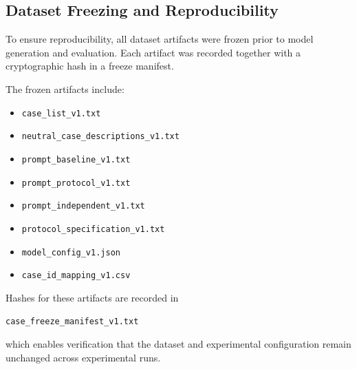 \subsection{Dataset Freezing and Reproducibility}

To ensure reproducibility, all dataset artifacts were frozen prior to model
generation and evaluation. Each artifact was recorded together with a
cryptographic hash in a freeze manifest.

The frozen artifacts include:

\begin{itemize}

\item \texttt{case\_list\_v1.txt}

\item \texttt{neutral\_case\_descriptions\_v1.txt}

\item \texttt{prompt\_baseline\_v1.txt}

\item \texttt{prompt\_protocol\_v1.txt}

\item \texttt{prompt\_independent\_v1.txt}

\item \texttt{protocol\_specification\_v1.txt}

\item \texttt{model\_config\_v1.json}

\item \texttt{case\_id\_mapping\_v1.csv}

\end{itemize}

Hashes for these artifacts are recorded in

\texttt{case\_freeze\_manifest\_v1.txt}

which enables verification that the dataset and experimental configuration
remain unchanged across experimental runs.
